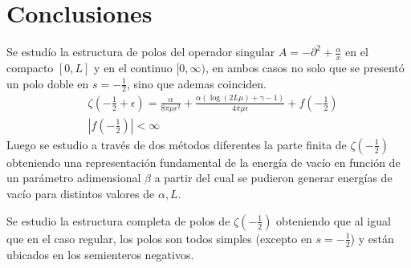 \chapter{Conclusiones}

Se estudío la estructura de polos del operador singular $A = - \partial ^2 + \frac{\alpha}{x} $ en el compacto $[0,L]$ y en el continuo $[0, \infty)$, en ambos casos no solo que se presentó un polo doble en $s= -\frac{1}{2}$, sino que ademas coinciden.
\begin{align*}
&
	\zeta \left( - \frac{1}{2} + \epsilon \right) = 
	\frac{\alpha}{8 \pi \mu  \epsilon  ^2} +
	\frac{\alpha \left( \log (2 L \mu ) + \gamma -1  \right)}{4 \pi \mu  \epsilon } +
	f \left( - \frac{1}{2} \right)
\\
&
	\left| f \left( - \frac{1}{2} \right) \right| < \infty
\end{align*}
Luego se estudio a través de dos métodos diferentes la parte finita de $\zeta \left( - \frac{1}{2} \right)$ obteniendo una representación fundamental de la energía de vacío en función de un parámetro adimensional $\beta$ a partir del cual se pudieron generar energías de vacío para distintos valores de $\alpha,L$.

Se estudio la estructura completa de polos de $\zeta \left( - \frac{1}{2} \right)$ obteniendo que al igual que en el caso regular, los polos son todos simples (excepto en $s= - \frac{1}{2}$) y están ubicados en los semienteros negativos.

